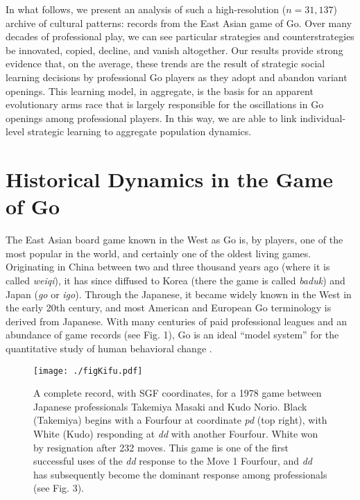\documentclass[reqno,12pt]{amsart}
\begin{document}
In what follows, we present an analysis of such a high-resolution
(\(n=31,137\)) archive of cultural patterns: records from the East Asian
game of Go. Over many decades of professional play, we can see
particular strategies and counterstrategies be innovated, copied,
decline, and vanish altogether. Our results provide strong evidence
that, on the average, these trends are the result of strategic social
learning decisions by professional Go players as they adopt and abandon
variant openings. This learning model, in aggregate, is the basis for an
apparent evolutionary arms race that is largely responsible for the
oscillations in Go openings among professional players. In this way, we
are able to link individual-level strategic learning to aggregate
population dynamics.

\section{Historical Dynamics in the Game of
Go}\label{historical-dynamics-in-the-game-of-go}

The East Asian board game known in the West as Go is, by players, one of
the most popular in the world, and certainly one of the oldest living
games. Originating in China between two and three thousand years ago
(where it is called \textit{weiqi}), it has since diffused to Korea
(there the game is called \textit{baduk}) and Japan (\textit{go} or
\textit{igo}). Through the Japanese, it became widely known in the West
in the early 20th century, and most American and European Go terminology
is derived from Japanese. With many centuries of paid professional
leagues and an abundance of game records (see Fig. 1), Go is an ideal
``model system'' for the quantitative study of human behavioral change
\citep{gobet2004moves}.

\begin{figure}[t]
  \begin{center}
    \texttt{[image: ./figKifu.pdf]}
    \caption{A complete record, with SGF coordinates, for a 1978 game between Japanese professionals Takemiya Masaki and Kudo Norio. Black (Takemiya) begins with a Fourfour at coordinate \textit{pd} (top right), with White (Kudo) responding at \textit{dd} with another Fourfour. White won by resignation after 232 moves. This game is one of the first successful uses of the \textit{dd} response to the Move 1 Fourfour, and \textit{dd} has subsequently become the dominant response among professionals (see Fig. 3).}
    \label{FigKifu}
  \end{center}
\end{figure}
\end{document}
